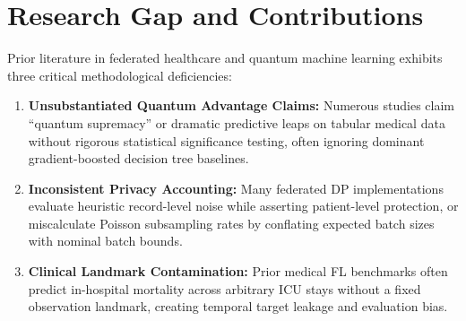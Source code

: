 \documentclass[conference]{IEEEtran}
\begin{document}
\section{Research Gap and Contributions}
Prior literature in federated healthcare and quantum machine learning exhibits three critical methodological deficiencies:
\begin{enumerate}
    \item \textbf{Unsubstantiated Quantum Advantage Claims:} Numerous studies claim ``quantum supremacy'' or dramatic predictive leaps on tabular medical data without rigorous statistical significance testing, often ignoring dominant gradient-boosted decision tree baselines.
    \item \textbf{Inconsistent Privacy Accounting:} Many federated DP implementations evaluate heuristic record-level noise while asserting patient-level protection, or miscalculate Poisson subsampling rates by conflating expected batch sizes with nominal batch bounds.
    \item \textbf{Clinical Landmark Contamination:} Prior medical FL benchmarks often predict in-hospital mortality across arbitrary ICU stays without a fixed observation landmark, creating temporal target leakage and evaluation bias.
\end{enumerate}
\end{document}
